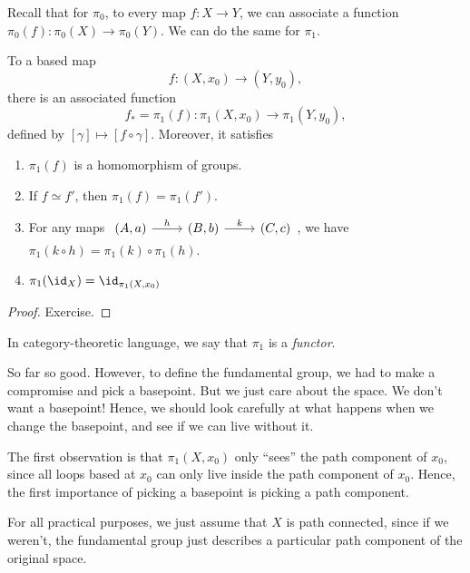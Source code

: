 \documentclass[a4paper]{article}
\begin{document}
Recall that for $\pi_0$, to every map $f: X\to Y$, we can associate a function $\pi_0(f): \pi_0(X) \to \pi_0(Y)$. We can do the same for $\pi_1$.
\begin{prop}
  To a based map
  \[
    f: (X, x_0) \to (Y, y_0),
  \]
  there is an associated function
  \[
    f_* = \pi_1(f): \pi_1(X, x_0) \to \pi_1(Y, y_0),
  \]
  defined by $[\gamma] \mapsto [f\circ \gamma]$. Moreover, it satisfies
  \begin{enumerate}
    \item $\pi_1(f)$ is a homomorphism of groups.
    \item If $f \simeq f'$, then $\pi_1(f) = \pi_1(f')$.
    \item For any maps $\begin{tikzcd} (A, a) \ar[r, "h"] & (B, b) \ar[r, "k"] & (C, c) \end{tikzcd}$, we have $\pi_1(k\circ h) = \pi_1(k)\circ \pi_1 (h)$.
    \item $\pi_1(\id_X) = \id_{\pi_1(X, x_0)}$
  \end{enumerate}
\end{prop}

\begin{proof}
  Exercise. %
\end{proof}
In category-theoretic language, we say that $\pi_1$ is a \emph{functor}.

So far so good. However, to define the fundamental group, we had to make a compromise and pick a basepoint. But we just care about the space. We don't want a basepoint! Hence, we should look carefully at what happens when we change the basepoint, and see if we can live without it.

The first observation is that $\pi_1(X, x_0)$ only ``sees'' the path component of $x_0$, since all loops based at $x_0$ can only live inside the path component of $x_0$. Hence, the first importance of picking a basepoint is picking a path component.

For all practical purposes, we just assume that $X$ is path connected, since if we weren't, the fundamental group just describes a particular path component of the original space.
\end{document}
